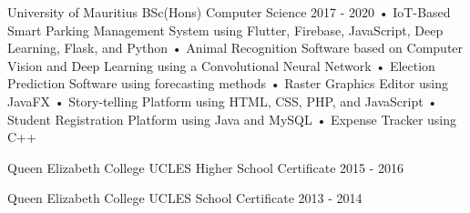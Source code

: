 

\begin{cventries}

  \cventry
    {University of Mauritius} %
    {BSc(Hons) Computer Science} %
    {} %
    {2017 - 2020} %
    {• IoT-Based Smart Parking Management System using Flutter, Firebase, JavaScript, Deep Learning, Flask, and Python\newline
    • Animal Recognition Software based on Computer Vision and Deep Learning using a Convolutional Neural Network\newline
    • Election Prediction Software using forecasting methods\newline
    • Raster Graphics Editor using JavaFX\newline
    • Story-telling Platform using HTML, CSS, PHP, and JavaScript\newline
    • Student Registration Platform using Java and MySQL\newline
    • Expense Tracker using C++\newline}
    
  \cventry
    {Queen Elizabeth College} %
    {UCLES Higher School Certificate} %
    {} %
    {2015 - 2016} %
    {}
    
  \cventry
    {Queen Elizabeth College} %
    {UCLES School Certificate} %
    {} %
    {2013 - 2014} %
    {}
\vspace{-0.7cm}
\end{cventries}
